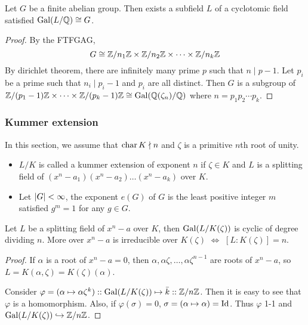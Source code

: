 \begin{theorem}
  Let $G$ be a finite abelian group. Then exists a subfield $L$ of a cyclotomic field satisfied $\operatorname{Gal}(L / \mathbb{Q}) \cong G$.

  \begin{proof}
    By the FTFGAG,
    \[ G \cong \mathbb{Z} / n_1 \mathbb{Z} \times \mathbb{Z} / n_2 \mathbb{Z} \times \dots \times \mathbb{Z} / n_k \mathbb{Z} \]
    By dirichlet theorem, there are infinitely many prime $p$ such that $n \mid p - 1$.
    Let $p_i$ be a prime such that $n_i \mid p_i - 1$ and $p_i$ are all distinct.
    Then $G$ is a subgroup of $\mathbb{Z} / (p_1 - 1) \mathbb{Z} \times \dots \times \mathbb{Z} / (p_k - 1) \mathbb{Z} \cong \operatorname{Gal}(\mathbb{Q}(\zeta_n) / \mathbb{Q})$
    where $n = p_1 p_2 \dotsm p_k$.
  \end{proof}
\end{theorem}

\subsubsection{Kummer extension}
In this section, we assume that $\operatorname{char} K \nmid n$ and $\zeta$ is a primitive $n$th root of unity.

\begin{definition} \hfill
  \begin{itemize}
    \item $L/K$ is called a kummer extension of exponent $n$ if $\zeta \in K$ and $L$ is a splitting field
      of $(x^n - a_1) (x^n - a_2) \dots (x^n - a_k)$ over $K$.
    \item Let $\lvert G\rvert < \infty$, the exponent $e(G)$ of $G$ is the least positive integer $m$
      satisfied $g^m = 1$ for any $g \in G$.
  \end{itemize}
\end{definition}

\begin{theorem}
  Let $L$ be a splitting field of $x^n - a$ over $K$, then $\operatorname{Gal}(L / K(\zeta))$ is cyclic of
  degree dividing $n$. More over $x^n - a$ is irreducible over $K(\zeta)$ $\iff$ $[L: K(\zeta)] = n$.

  \begin{proof}
    If $\alpha$ is a root of $x^n - a = 0$, then $\alpha, \alpha \zeta, \dots, \alpha \zeta^{n-1}$
    are roots of $x^n - a$, so $L = K(\alpha, \zeta) = K(\zeta)(\alpha)$.

    Consider $\varphi = (\alpha \mapsto \alpha \zeta^k) :: \operatorname{Gal}(L / K(\zeta)) \mapsto \bar{k} :: \mathbb{Z} / n\mathbb{Z}$.
    Then it is easy to see that $\varphi$ is a homomorphism. Also, if $\varphi(\sigma) = 0$,
    $\sigma = (\alpha \mapsto \alpha) = {\rm Id}$. Thus $\varphi$ 1-1 and
    $\operatorname{Gal}(L / K(\zeta)) \hookrightarrow {\mathbb{Z}}/{n\mathbb{Z}}$.
  \end{proof}
\end{theorem}

